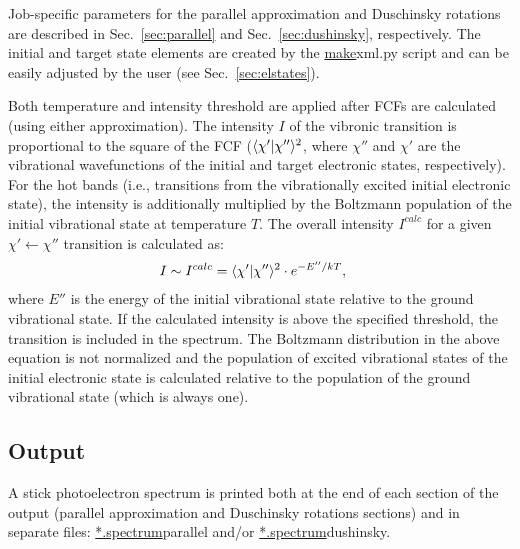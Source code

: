 \documentclass[11pt]{article}
\begin{document}
Job-specific parameters for the parallel approximation and Duschinsky rotations are described
in Sec.~\ref{sec:parallel} and Sec.~\ref{sec:dushinsky}, respectively. The initial and target state elements are created 
by the \ul{make}{xml.py} script and can be easily adjusted by the user (see Sec.~\ref{sec:elstates}).

Both temperature and intensity threshold are applied after FCFs are calculated
(using either approximation).
The intensity $I$ of the vibronic transition is proportional to the square of the FCF 
($\langle \chi '|\chi''\rangle^2$, where $\chi''$ and $\chi '$ are the 
vibrational wavefunctions of the initial and target electronic states, respectively).
For the hot bands (i.e., transitions from the vibrationally excited initial electronic state),
the intensity is additionally multiplied by the Boltzmann population of the
initial vibrational state at temperature $T$. 
The overall intensity $I^{calc}$ for a given $\chi ' \leftarrow \chi''$ transition
is calculated as:
\begin{align}
I\sim I^{calc}&=\langle \chi '|\chi''\rangle^2\cdot e^{-E''/kT},
\label{eq:intens}
\end{align}
where $E''$ is the energy of the initial vibrational state relative to the ground vibrational state.
If the calculated intensity is above the specified threshold, the transition is included in the spectrum.
The Boltzmann distribution in the above equation is not normalized and the population of excited vibrational
states of the initial electronic state is calculated relative to the population of the ground vibrational
state (which is always one). 



\subsection{Output}
\label{sec:output}

A stick photoelectron spectrum is printed both at the end of each section of the output 
(parallel approximation and Duschinsky rotations sections)
and in separate files: \ul{*.spectrum}{parallel} and/or \ul{*.spectrum}{dushinsky}.
\end{document}
